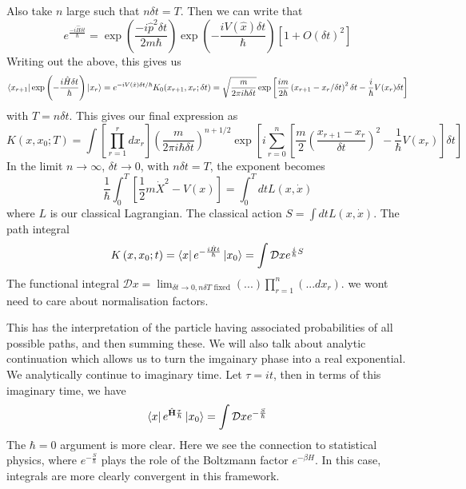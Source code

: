 \documentclass[11pt, oneside]{article}   	%
\theoremstyle{slanted}
\newcommand{\planck}{\hbar}
\renewcommand{\op}[1]{\hat{\mathbf{#1}}}
\begin{document}
Also take $ n $ large such that $ n \delta t  = T $. 
Then we can write that 
\[
 e ^{ \frac{ - i \hat{ H } \delta t }{ \planck } }  = \exp\left( \frac{ 
 - i \hat{ p } ^ 2 \delta t }{ 2 m \planck }  \right)  \exp\left( 
- \frac{ i V ( \hat{ x } ) \delta t }{ \planck }\right) \left[  
1 + O ( \delta t ) ^ 2  \right]  
\] 
Writing out the above, this gives us 
\[
\bra{ x _{ r + 1 } } \exp\left(   - \frac{ i \hat{ H } \delta t  }{ \planck } \right)
\ket{ x _ r }  = e ^{  - i V ( \hat{ x } ) \delta t  / \planck } K _ 0 ( 
x _{ r + 1 }, x _ r ; \delta t )  =
\sqrt{ \frac{m}{2 \pi i \planck  \delta t }} \exp
\left[  \frac{ i m }{ 2 \planck} \left( x_{ r + 1 }  - x _ r  / \delta t  \right)^ 2 \delta t 
- \frac{ i  }{\planck} V ( x _r ) \delta t \right] 
\] with $ T = n \delta t $. 
This gives our final expression as 
\[
K \left( x, x_0 ; T  \right)   = 
\int \left[  \prod_{r = 1 }^ r d x _r  \right]  
\left( \frac{m}{ 2 \pi i \planck \delta t }  \right)  ^{ n +1  / 2 } 
\exp \left[  i \sum_{ r = 0 } ^ n \left[  
\frac{m}{ 2} \left( \frac{x_{ r + 1 }  - x _ r }{ \delta t }  \right) ^ 2  - \frac{1}{ \planck}
V ( x _ r ) \right]   \delta t  \right] 
\] In the limit $ n \to \infty $, $ \delta t \to 0 $, 
with $ n \delta t  = T $, the exponent becomes 
\[
\frac{1}{ \planck} \int _ 0 ^ T \left[  
\frac{1}{2 } m \dot{  X  } ^ 2  - V ( x )  \right] = 
\int_ 0 ^ T dt L \left( x , \dot{ x }   \right) 
\] where $ L $ is our classical Lagrangian. 
The classical action $S  = \int dt L ( x , \dot{ x   } )  $. 
The path integral 
\[
K \left( x, x_0 ; t  \right)   = \bra{x }e ^{  - \frac{ i \hat{ H } t }{ \planck}} \ket{ x_0 } =  
\int \mathcal{ D } x e ^{  \frac{i}{\planck} S }
\] The functional integral $ \mathcal{ D } x  = \lim_{ \delta t \to 0 , n \delta T 
\text{ fixed}} \left( ... \right) \prod_{ r = 1 }^{ n } \left( ... dx_r  \right) $. 
we wont need to care about normalisation factors. 

This has the interpretation 
of the particle having associated probabilities of all 
possible paths, and then summing these. 
We will also talk about analytic continuation 
which allows us to turn the imgainary 
phase into a real exponential. 
We analytically continue to imaginary time. 
Let $ \tau  = it $, then in terms 
of this imaginary time, 
we have 
\[
\bra{ x } e ^{ \op{ H }\frac{\tau}{\planck}} \ket{x_0 } 
= \int \mathcal{ D } x e ^{  - \frac{S}{\planck}}
\]
The $ \planck  = 0 $ argument is more clear. 
Here we see the connection to 
statistical physics, where 
$ e ^{  - \frac{S}{\planck } } $ plays the role 
of the Boltzmann factor $ e ^{  -\beta H } $. 
In this case, integrals are more clearly convergent 
in this framework. 
\end{document}
